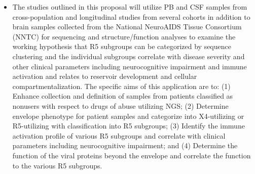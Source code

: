 \documentclass[a4paper,11pt]{article}
\makeatletter
\newenvironment{fullwidth}
    {\par
     \setlength{\@totalleftmargin}{0pt}%
     \setlength{\linewidth}{\hsize}%
     \list{}{\setlength{\leftmargin}{0pt}}
     \item\relax}
    {\endlist}
\makeatother
\begin{document}
\begin{enumerate}
\begin{itemize}
\begin{fullwidth}
The studies outlined in this proposal will utilize PB and CSF samples from cross-population and longitudinal studies from several cohorts in addition to brain samples collected from the National NeuroAIDS Tissue Consortium (NNTC) for sequencing and structure/function analyses to examine the working hypothesis that R5 subgroups can be categorized by sequence clustering and the individual subgroups correlate with disease severity and other clinical parameters including neurocognitive impairment and immune activation and relates to reservoir development and cellular compartmentalization. 
The specific aims of this application are to: (1) Enhance collection and definition of samples from patients classified as nonusers with respect to drugs of abuse utilizing NGS; (2) Determine envelope phenotype for patient samples and categorize into X4-utilizing or R5-utilizing with classification into R5 subgroups; (3) Identify the immune activation profile of various R5 subgroups and correlate with clinical parameters including neurocognitive impairment; and (4) Determine the function of the viral proteins beyond the envelope and correlate the function to the various R5 subgroups.
    \end{fullwidth}
    

\end{itemize}
\end{enumerate}
\end{document}
